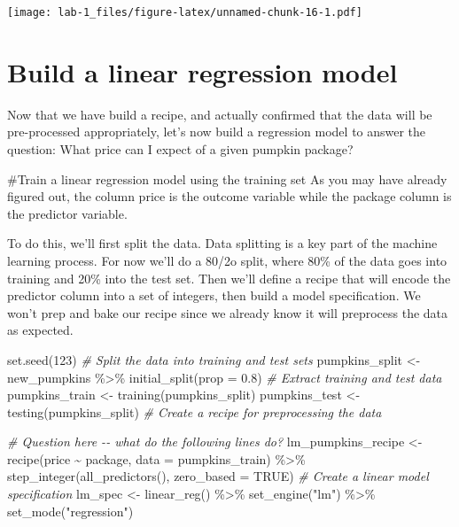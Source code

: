 \documentclass[
]{article}
\newenvironment{Shaded}{\begin{snugshade}}{\end{snugshade}}
\newcommand{\AttributeTok}[1]{\textcolor[rgb]{0.77,0.63,0.00}{#1}}
\newcommand{\CommentTok}[1]{\textcolor[rgb]{0.56,0.35,0.01}{\textit{#1}}}
\newcommand{\ConstantTok}[1]{\textcolor[rgb]{0.00,0.00,0.00}{#1}}
\newcommand{\DecValTok}[1]{\textcolor[rgb]{0.00,0.00,0.81}{#1}}
\newcommand{\FloatTok}[1]{\textcolor[rgb]{0.00,0.00,0.81}{#1}}
\newcommand{\FunctionTok}[1]{\textcolor[rgb]{0.00,0.00,0.00}{#1}}
\newcommand{\NormalTok}[1]{#1}
\newcommand{\OtherTok}[1]{\textcolor[rgb]{0.56,0.35,0.01}{#1}}
\newcommand{\SpecialCharTok}[1]{\textcolor[rgb]{0.00,0.00,0.00}{#1}}
\newcommand{\StringTok}[1]{\textcolor[rgb]{0.31,0.60,0.02}{#1}}
\begin{document}
\texttt{[image: lab-1\_files/figure-latex/unnamed-chunk-16-1.pdf]}

\hypertarget{build-a-linear-regression-model}{%
\section{Build a linear regression
model}\label{build-a-linear-regression-model}}

Now that we have build a recipe, and actually confirmed that the data
will be pre-processed appropriately, let's now build a regression model
to answer the question: What price can I expect of a given pumpkin
package?

\#Train a linear regression model using the training set As you may have
already figured out, the column price is the outcome variable while the
package column is the predictor variable.

To do this, we'll first split the data. Data splitting is a key part of
the machine learning process. For now we'll do a 80/2o split, where 80\%
of the data goes into training and 20\% into the test set. Then we'll
define a recipe that will encode the predictor column into a set of
integers, then build a model specification. We won't prep and bake our
recipe since we already know it will preprocess the data as expected.

\begin{Shaded}
\begin{Highlighting}[]
\FunctionTok{set.seed}\NormalTok{(}\DecValTok{123}\NormalTok{)}
\CommentTok{\# Split the data into training and test sets}
\NormalTok{pumpkins\_split }\OtherTok{\textless{}{-}}\NormalTok{ new\_pumpkins }\SpecialCharTok{\%\textgreater{}\%} 
  \FunctionTok{initial\_split}\NormalTok{(}\AttributeTok{prop =} \FloatTok{0.8}\NormalTok{)}
\CommentTok{\# Extract training and test data}
\NormalTok{pumpkins\_train }\OtherTok{\textless{}{-}} \FunctionTok{training}\NormalTok{(pumpkins\_split)}
\NormalTok{pumpkins\_test }\OtherTok{\textless{}{-}} \FunctionTok{testing}\NormalTok{(pumpkins\_split)}
\CommentTok{\# Create a recipe for preprocessing the data}
  

      \CommentTok{\# Question here {-}{-} what do the following lines do?}
\NormalTok{lm\_pumpkins\_recipe }\OtherTok{\textless{}{-}} \FunctionTok{recipe}\NormalTok{(price }\SpecialCharTok{\textasciitilde{}}\NormalTok{ package, }\AttributeTok{data =}\NormalTok{ pumpkins\_train) }\SpecialCharTok{\%\textgreater{}\%} 
  \FunctionTok{step\_integer}\NormalTok{(}\FunctionTok{all\_predictors}\NormalTok{(), }\AttributeTok{zero\_based =} \ConstantTok{TRUE}\NormalTok{)}
\CommentTok{\# Create a linear model specification}
\NormalTok{lm\_spec }\OtherTok{\textless{}{-}} \FunctionTok{linear\_reg}\NormalTok{() }\SpecialCharTok{\%\textgreater{}\%} 
  \FunctionTok{set\_engine}\NormalTok{(}\StringTok{"lm"}\NormalTok{) }\SpecialCharTok{\%\textgreater{}\%} 
  \FunctionTok{set\_mode}\NormalTok{(}\StringTok{"regression"}\NormalTok{)}
\end{Highlighting}
\end{Shaded}
\end{document}
